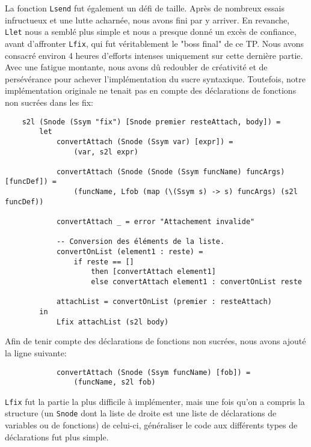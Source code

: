 \documentclass{article}
\begin{document}
\noindent La fonction \texttt{Lsend} fut également un défi de taille. Après de nombreux essais infructueux et une lutte acharnée, nous avons fini par y arriver. En revanche, \texttt{Llet} nous a semblé plus simple et nous a presque donné un excès de confiance, avant d'affronter \texttt{Lfix}, qui fut véritablement le "boss final" de ce TP. Nous avons consacré environ 4 heures d'efforts intenses uniquement sur cette dernière partie. Avec une fatigue montante, nous avons dû redoubler de créativité et de persévérance pour achever l'implémentation du sucre syntaxique. Toutefois, notre implémentation originale ne tenait pas en compte des déclarations de fonctions non sucrées dans les fix:
{\footnotesize
\begin{verbatim}
    s2l (Snode (Ssym "fix") [Snode premier resteAttach, body]) =
        let 
            convertAttach (Snode (Ssym var) [expr]) = 
                (var, s2l expr)
      
            convertAttach (Snode (Snode (Ssym funcName) funcArgs) [funcDef]) = 
                (funcName, Lfob (map (\(Ssym s) -> s) funcArgs) (s2l funcDef))
      
            convertAttach _ = error "Attachement invalide"
      
            -- Conversion des éléments de la liste.
            convertOnList (element1 : reste) =
                if reste == []
                    then [convertAttach element1]
                    else convertAttach element1 : convertOnList reste
      
            attachList = convertOnList (premier : resteAttach)
        in 
            Lfix attachList (s2l body)
\end{verbatim}
}
\noindent Afin de tenir compte des déclarations de fonctions non sucrées, nous avons ajouté la ligne suivante:
{\footnotesize
\begin{verbatim}
            convertAttach (Snode (Ssym funcName) [fob]) = 
                (funcName, s2l fob)
\end{verbatim}
}
\noindent \texttt{Lfix} fut la partie la plus difficile à implémenter, mais une fois qu'on a compris la structure (un \texttt{Snode} dont la liste de droite est une liste de déclarations de variables ou de fonctions) de celui-ci, généraliser le code aux différents types de déclarations fut plus simple.\\ 
\end{document}

